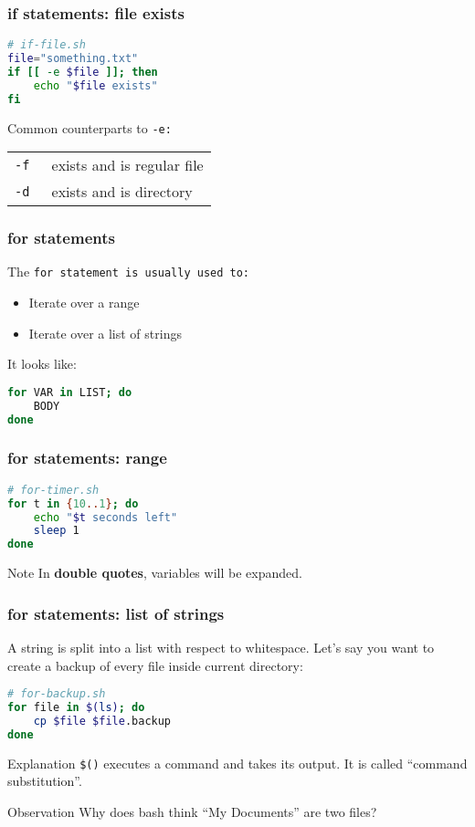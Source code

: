 \begin{frame}[fragile]
\frametitle{\textbf{if} statements: file exists}
\begin{lstlisting}[language=bash]
# if-file.sh
file="something.txt"
if [[ -e $file ]]; then
    echo "$file exists"
fi
\end{lstlisting}
Common counterparts to \tt{-e}:
\begin{table}
    \centering
    \begin{tabular}{ll}
        \tt{-f} & exists and is regular file \\
        \tt{-d} & exists and is directory
    \end{tabular}
\end{table}
\end{frame}

\begin{frame}[fragile]
\frametitle{\textbf{for} statements}
The \tt{for} statement is usually used to:
\begin{itemize}
    \item Iterate over a range
    \item Iterate over a list of strings
\end{itemize}
It looks like:
\begin{lstlisting}[language=bash]
for VAR in LIST; do
    BODY
done
\end{lstlisting}
\end{frame}

\begin{frame}[fragile]
\frametitle{\textbf{for} statements: range}
\begin{lstlisting}[language=bash]
# for-timer.sh
for t in {10..1}; do
    echo "$t seconds left"
    sleep 1
done
\end{lstlisting}
\begin{block}{Note}
    In \textbf{double quotes}, variables will be expanded.
\end{block}
\end{frame}

\begin{frame}[fragile]
\frametitle{\textbf{for} statements: list of strings}
A string is split into a list with respect to whitespace.
\newline \newline
Let's say you want to create a backup of every file inside current directory:
\begin{lstlisting}[language=bash]
# for-backup.sh
for file in $(ls); do
    cp $file $file.backup
done
\end{lstlisting}
\begin{block}{Explanation}
    \verb|$()| executes a command and takes its output.
    It is called ``command substitution''.
\end{block}
\begin{block}{Observation}
    Why does bash think ``My Documents'' are two files?
\end{block}
\end{frame}

